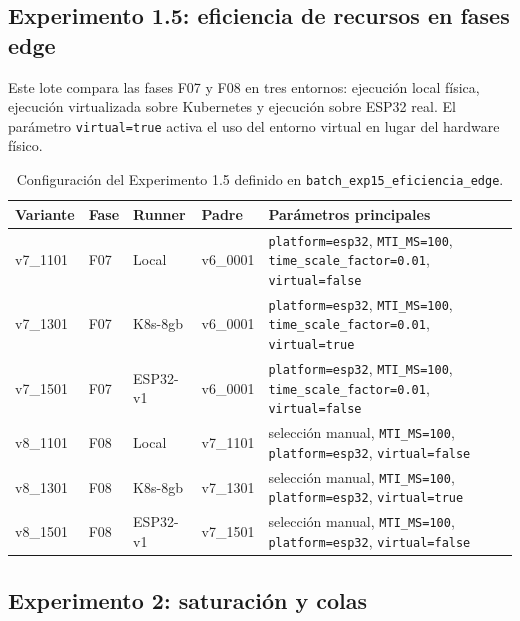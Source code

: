 \subsection{Experimento 1.5: eficiencia de recursos en fases edge}
\label{anexo:exp15-eficiencia-edge}

Este lote compara las fases F07 y F08 en tres entornos: ejecución local física, ejecución virtualizada sobre Kubernetes y ejecución sobre ESP32 real. El parámetro \texttt{virtual=true} activa el uso del entorno virtual en lugar del hardware físico.

\begin{table}[htbp]
    \centering
    \caption{Configuración del Experimento 1.5 definido en \texttt{batch\_exp15\_eficiencia\_edge}.}
    \label{tab:params-exp15-eficiencia-edge}
    \begin{tabular}{p{}p{}p{}p{}p{}}
        \hline
        \textbf{Variante} & \textbf{Fase} & \textbf{Runner} & \textbf{Padre} & \textbf{Parámetros principales} \\
        \hline
        v7\_1101 & F07 & Local & v6\_0001 & \texttt{platform=esp32}, \texttt{MTI\_MS=100}, \texttt{time\_scale\_factor=0.01}, \texttt{virtual=false} \\
        v7\_1301 & F07 & K8s-8gb & v6\_0001 & \texttt{platform=esp32}, \texttt{MTI\_MS=100}, \texttt{time\_scale\_factor=0.01}, \texttt{virtual=true} \\
        v7\_1501 & F07 & ESP32-v1 & v6\_0001 & \texttt{platform=esp32}, \texttt{MTI\_MS=100}, \texttt{time\_scale\_factor=0.01}, \texttt{virtual=false} \\
        v8\_1101 & F08 & Local & v7\_1101 & selección manual, \texttt{MTI\_MS=100}, \texttt{platform=esp32}, \texttt{virtual=false} \\
        v8\_1301 & F08 & K8s-8gb & v7\_1301 & selección manual, \texttt{MTI\_MS=100}, \texttt{platform=esp32}, \texttt{virtual=true} \\
        v8\_1501 & F08 & ESP32-v1 & v7\_1501 & selección manual, \texttt{MTI\_MS=100}, \texttt{platform=esp32}, \texttt{virtual=false} \\
        \hline
    \end{tabular}
\end{table}

\subsection{Experimento 2: saturación y colas}
\label{anexo:exp2-saturacion}

